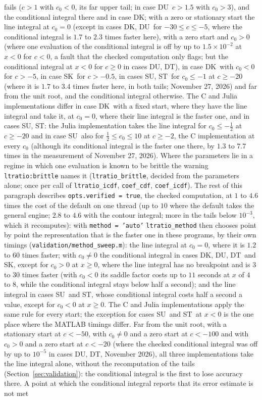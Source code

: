 \documentclass[11pt]{article}
\newcommand{\code}[1]{\texttt{#1}}
\newcommand{\Fk}{\textsf{DK}}
\newcommand{\Fu}{\textsf{DU}}
\newcommand{\Ft}{\textsf{DT}}
\newcommand{\Sk}{\textsf{SK}}
\newcommand{\Su}{\textsf{SU}}
\newcommand{\St}{\textsf{ST}}
\begin{document}
fails ($c>1$ with $c_0<0$, its far upper tail; in case \Fu\ $c>1.5$ with $c_0>3$), and the conditional integral there and in case \Fk; with a zero or stationary start the line integral at $c_0=0$ (except in cases \Fk, \Fu\ for $-30\le c\le-5$, where the conditional integral is $1.7$ to $2.3$ times faster here), with a zero start and $c_0>0$ (where one evaluation of the conditional integral is off by up to $1.5\times10^{-2}$ at $x<0$ for $c<0$, a fault that the checked computation only flags; but the conditional integral at $x<0$ for $c\ge0$ in cases \Fu, \Ft), in case \Fk\ with $c_0<0$ for $c>-5$, in case \Sk\ for $c>-0.5$, in cases \Su, \St\ for $c_0\le-1$ at $c\ge-20$ (where it is $1.7$ to $3.4$ times faster here, in both tails; November 27, 2026) and far from the unit root, and the conditional integral otherwise.  The C and Julia implementations differ in case \Fk\ with a fixed start, where they have the line integral and take it, at $c_0=0$, where their line integral is the faster one, and in cases \Su, \St: the Julia implementation takes the line integral for $c_0\le-\frac12$ at $c\ge-20$ and in case \Su\ also for $\frac12\le c_0\le10$ at $c\ge-2$, the C implementation at every $c_0$ (although its conditional integral is the faster one there, by $1.3$ to $7.7$ times in the measurement of November 27, 2026).  Where the parameters lie in a regime in which one evaluation is known to be brittle the warning \code{ltratio:brittle} names it (\code{ltratio\_brittle}, decided from the parameters alone; once per call of \code{ltratio\_icdf}, \code{coef\_cdf}, \code{coef\_icdf}).  The rest of this paragraph describes \code{opts.verified = true}, the checked computation, at $1$ to $4.6$ times the cost of the default on one thread (up to $10$ where the default takes the general engine; $2.8$ to $4.6$ with the contour integral; more in the tails below $10^{-3}$, which it recomputes): with \code{method = 'auto'} \code{ltratio\_method} then chooses point by point the representation that is the faster one in these programs, by their own timings (\code{validation/method\_sweep.m}): the line integral at $c_0=0$, where it is $1.2$ to $60$ times faster; with $c_0\ne0$ the conditional integral in cases \Fk, \Fu, \Ft\ and \Sk, except for $c_0>0$ at $x\ge0$, where the line integral has no breakpoint and is $3$ to $30$ times faster (with $c_0<0$ its saddle factor costs up to $11$ seconds at $x$ of $4$ to $8$, while the conditional integral stays below half a second); and the line integral in cases \Su\ and \St, whose conditional integral costs half a second a value, except for $c_0<0$ at $x\ge0$.  The C and Julia implementations apply the same rule for every start; the exception for cases \Su\ and \St\ at $x<0$ is the one place where the MATLAB timings differ.  Far from the unit root, with a stationary start at $c<-50$, with $c_0\ne0$ and a zero start at $c<-100$ and with $c_0>0$ and a zero start at $c<-20$ (where the checked conditional integral was off by up to $10^{-5}$ in cases \Fu, \Ft, November 2026), all three implementations take the line integral alone, without the recomputation of the tails (Section~\ref{sec:validation}): the conditional integral is the first to lose accuracy there.  A point at which the conditional integral reports that its error estimate is not met 
\end{document}
